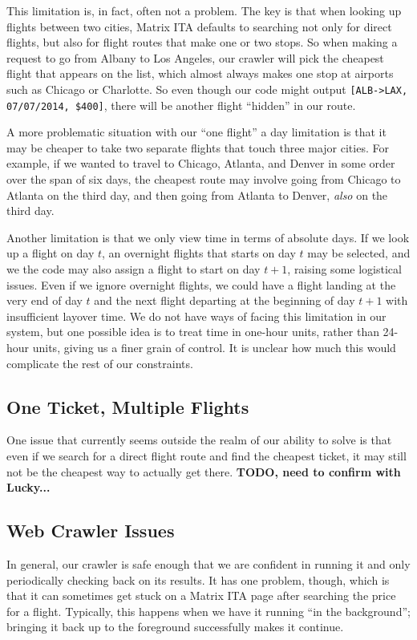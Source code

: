 \documentclass{article}
\begin{document}
This limitation is, in fact, often not a problem. The key is that when looking up flights between two cities, Matrix ITA defaults to searching not
only for direct flights, but also for flight routes that make one or two stops. So when making a request to go from Albany to Los Angeles, our crawler
will pick the cheapest flight that appears on the list, which almost always makes one stop at airports such as Chicago or Charlotte. So even though
our code might output \texttt{[ALB->LAX, 07/07/2014, \$400]}, there will be another flight ``hidden'' in our route.

A more problematic situation with our ``one flight'' a day limitation is that it may be cheaper to take two separate flights that touch three major
cities. For example, if we wanted to travel to Chicago, Atlanta, and Denver in some order over the span of six days, the cheapest route may involve
going from Chicago to Atlanta on the third day, and then going from Atlanta to Denver, \emph{also} on the third day.

Another limitation is that we only view time in terms of absolute days. If we look up a flight on day $t$, an overnight flights that starts on day $t$
may be selected, and we the code may also assign a flight to start on day $t+1$, raising some logistical issues. Even if we ignore overnight flights,
we could have a flight landing at the very end of day $t$ and the next flight departing at the beginning of day $t+1$ with insufficient layover time.
We do not have ways of facing this limitation in our system, but one possible idea is to treat time in one-hour units, rather than 24-hour units,
giving us a finer grain of control. It is unclear how much this would complicate the rest of our constraints.

\subsection{One Ticket, Multiple Flights}

One issue that currently seems outside the realm of our ability to solve is that even if we search for a direct flight route and find the cheapest
ticket, it may still not be the cheapest way to actually get there. \textbf{TODO, need to confirm with Lucky...}

\subsection{Web Crawler Issues}

In general, our crawler is safe enough that we are confident in running it and only periodically checking back on its results. It has one problem,
though, which is that it can sometimes get stuck on a Matrix ITA page after searching the price for a flight. Typically, this happens when we have it
running ``in the background''; bringing it back up to the foreground successfully makes it continue.
\end{document}
